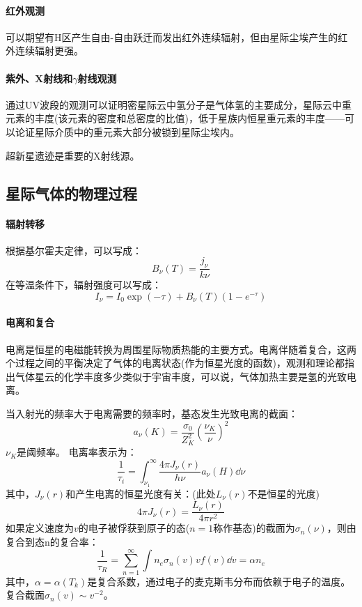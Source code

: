 \paragraph{红外观测}可以期望有H区产生自由-自由跃迁而发出红外连续辐射，但由星际尘埃产生的红外连续辐射更强。
\paragraph{紫外、X射线和$\gamma$射线观测}通过UV波段的观测可以证明密星际云中氢分子是气体氢的主要成分，星际云中重元素的丰度(该元素的密度和总密度的比值)，低于星族内恒星重元素的丰度——可以论证星际介质中的重元素大部分被锁到星际尘埃内。

超新星遗迹是重要的X射线源。
\subsection{星际气体的物理过程}
\paragraph{辐射转移}
根据基尔霍夫定律，可以写成：
\begin{equation}
	B_{\nu}(T)=\frac{j_{\nu}}{k\nu}
\end{equation}
在等温条件下，辐射强度可以写成：
\begin{equation}
	I_{\nu}=I_{0}\exp(-\tau)+B_{\nu}(T)(1-e^{-\tau})
\end{equation}
\paragraph{电离和复合}
电离是恒星的电磁能转换为周围星际物质热能的主要方式。电离伴随着复合，这两个过程之间的平衡决定了气体的电离状态(作为恒星光度的函数)，观测和理论都指出气体星云的化学丰度多少类似于宇宙丰度，可以说，气体加热主要是氢的光致电离。

当入射光的频率大于电离需要的频率时，基态发生光致电离的截面：
\begin{equation}
	a_{\nu}(K)=\frac{\sigma_{0}}{Z_{K}^2}\left(\frac{\nu_{K}}{\nu}\right)^2
\end{equation}
$\nu_{K}$是阈频率。
电离率表示为：
\begin{equation}
	\frac{1}{\tau_{i}}=\int_{\nu_{1}}^{\infty}\frac{4\pi J_{\nu}(r)}{h\nu}a_{\nu}(H)\dd \nu
\end{equation}
其中，$J_{\nu}(r)$和产生电离的恒星光度有关：(此处$L_{\nu}(r)$不是恒星的光度)
\begin{equation}
	4\pi J_{\nu}(r)=\frac{L_{\nu}(r)}{4\pi r^2}
\end{equation}
如果定义速度为$v$的电子被俘获到原子的态($n=1$称作基态)的截面为$\sigma_{n}(\nu)$，则由复合到态n的复合率：
\begin{equation}
	\frac{1}{\tau_{R}}=\sum_{n=1}^{\infty}\int n_{e}\sigma_{n}(v)vf(v)\dd v=\alpha n_{e}
\end{equation}
其中，$\alpha=\alpha(T_{k})$是复合系数，通过电子的麦克斯韦分布而依赖于电子的温度。复合截面$\sigma_{n}(v)\sim v^{-2}$。

